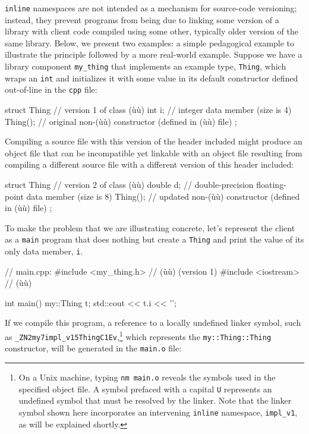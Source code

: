 \lstinline!inline! namespaces are not intended as a mechanism for
source-code versioning; instead, they prevent programs from being
 due to linking some version of a library with client
code compiled using some other, typically older version of the same
library. Below, we present two examples: a simple pedagogical example
to illustrate the principle followed by a more real-world example.
Suppose we have a library component \lstinline!my_thing! that implements
an example type, \lstinline!Thing!, which wraps an \lstinline!int! and
initializes it with some value in its default constructor defined
out-of-line in the \lstinline!cpp! file:

\begin{emcppslisting}
struct Thing  // version 1 of class (ù{}ù)
{
    int i;    // integer data member (size is 4)
    Thing();  // original non-(ù{}ù) constructor (defined in (ù{}ù) file)
};
\end{emcppslisting}

\noindent Compiling a source file with this version of the header included might produce an object file that can be incompatible yet linkable with an object file resulting from compiling a different source file with a different version of this header included:

\begin{emcppslisting}
struct Thing   // version 2 of class (ù{}ù)
{
    double d;  // double-precision floating-point data member (size is 8)
    Thing();   // updated non-(ù{}ù) constructor (defined in (ù{}ù) file)
};
\end{emcppslisting}

\noindent To make the problem that we are illustrating concrete, let's represent
the client as a \lstinline!main! program that does nothing but create a
\lstinline!Thing! and print the value of its only data member, \lstinline!i!.

\begin{emcppslisting}[emcppsbatch=e4]
// main.cpp:
#include <my_thing.h>  // (ù{}ù) (version 1)
#include <iostream>    // (ù{}ù)

int main()
{
     my::Thing t;
     std::cout << t.i << '\n';
}
\end{emcppslisting}

\noindent If we compile this program, a reference to a locally undefined linker
symbol, such as
\lstinline!_ZN2my7impl_v15ThingC1Ev!,{\cprotect\footnote{On a Unix
machine, typing \lstinline!nm!~\lstinline!main.o! reveals the symbols used
in the specified object file. A symbol prefaced with a capital
\lstinline!U! represents an undefined symbol that must be resolved by the
linker. Note that the linker symbol shown here incorporates an
intervening \lstinline!inline! namespace, \lstinline!impl_v1!, as will be
  explained shortly.}} which represents the \lstinline!my::Thing::Thing!
constructor, will be generated in the \lstinline!main.o! file:

